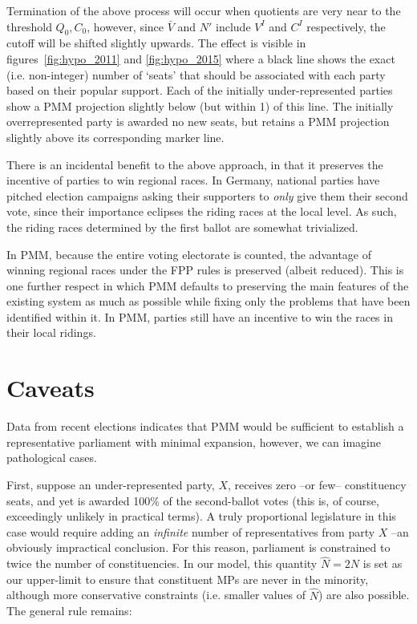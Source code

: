 \documentclass[DIV=calc, paper=a4, fontsize=11pt, twocolumn]{scrartcl}	 %
\begin{document}
Termination of the above process will occur when quotients are very near to the threshold $Q_0,C_0$, however, since $\bar V$ and $N'$ include $V^I$ and $C^I$ respectively, the cutoff will be shifted slightly upwards. The effect is visible in figures~\ref{fig:hypo_2011} and \ref{fig:hypo_2015} where a black line shows the exact (i.e. non-integer) number of `seats' that should be associated with each party based on their popular support. Each of the initially under-represented parties show a PMM projection slightly below (but within 1) of this line. The initially overrepresented party is awarded no new seats, but retains a PMM projection slightly above its corresponding marker line.

There is an incidental benefit to the above approach, in that it preserves the incentive of parties to win regional races. In Germany, national parties have pitched election campaigns asking their supporters to \emph{only} give them their second vote, since their importance eclipses the riding races at the local level. As such, the riding races determined by the first ballot are somewhat trivialized.

In PMM, because the entire voting electorate is counted, the advantage of winning regional races under the FPP rules is preserved (albeit reduced). This is one further respect in which PMM defaults to preserving the main features of the existing system as much as possible while fixing only the problems that have been identified within it. In PMM, parties still have an incentive to win the races in their local ridings.

\section{Caveats}

Data from recent elections indicates that PMM would be sufficient to establish a representative parliament with minimal expansion, however, we can imagine pathological cases. 

First, suppose an under-represented party, $X$, receives zero \---or few\--- constituency seats, and yet is awarded 100\% of the second-ballot votes (this is, of course, exceedingly unlikely in practical terms). 
A truly proportional legislature in this case would require adding an \emph{infinite} number of representatives from party \textbf{$X$} \---an obviously impractical conclusion. For this reason, parliament is constrained to twice the number of constituencies. In our model, this quantity $\hat N = 2 N$ is set as our upper-limit to ensure that constituent MPs are never in the minority, although more conservative constraints (i.e. smaller values of $\hat N$) are also possible. The general rule remains:
\end{document}
